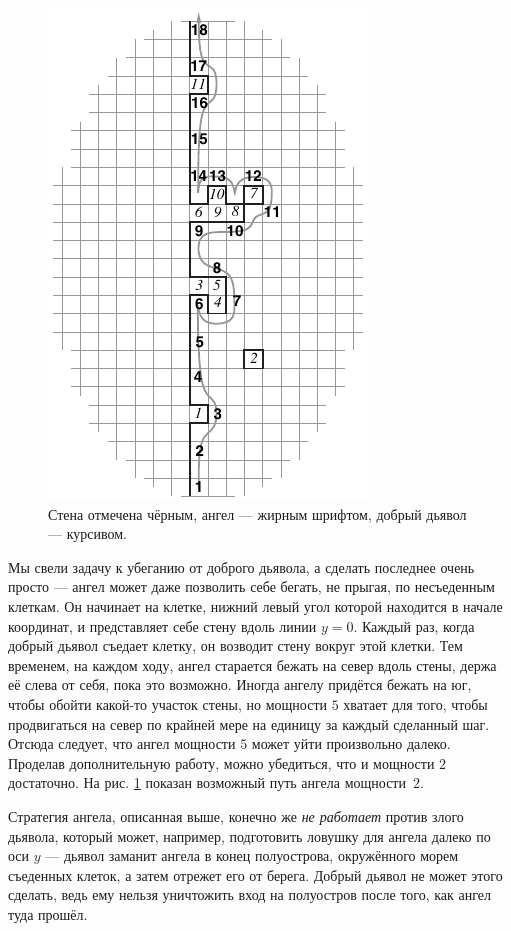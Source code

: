 \begin{figure}[htb!]
\centering
\includegraphics[scale=1]{pics/angel}
\caption{Стена отмечена чёрным, ангел --- жирным шрифтом, добрый дьявол --- курсивом.}
\label{pic:angel}
\end{figure}

Мы свели задачу к убеганию от доброго дьявола, а сделать последнее очень просто ---
ангел может даже позволить себе бегать, не прыгая, по несъеденным клеткам.
Он начинает на клетке, нижний левый угол которой находится в начале координат, и представляет себе стену вдоль линии $y = 0$.
Каждый раз, когда добрый дьявол съедает клетку, он возводит стену вокруг этой клетки.
Тем временем, на каждом ходу, ангел старается бежать на север вдоль стены, держа её слева от себя, пока это возможно.
Иногда ангелу придётся бежать на юг, чтобы обойти какой-то участок стены, но мощности $5$ 
хватает для того, чтобы продвигаться на север по крайней мере на единицу за каждый сделанный шаг.
Отсюда следует, что ангел мощности $5$ может уйти произвольно далеко.
Проделав дополнительную работу, можно убедиться, что и мощности $2$ достаточно.
На рис. \ref{pic:angel} показан возможный путь ангела мощности~$2$.

Стратегия ангела, описанная выше, конечно же \emph{не работает} против злого дьявола, который может, например, подготовить ловушку для ангела далеко по оси $y$ --- дьявол заманит ангела в конец полуострова, окружённого морем съеденных клеток, а затем отрежет его от берега.
Добрый дьявол не может этого сделать, ведь ему нельзя уничтожить вход на полуостров после того, как ангел туда прошёл.

